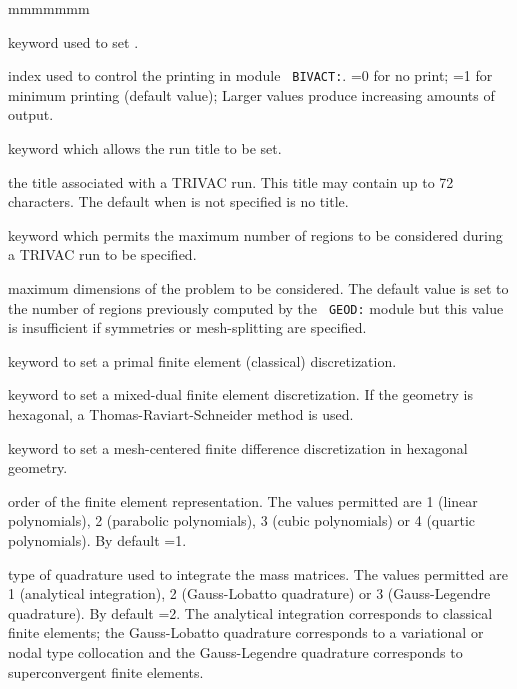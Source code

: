 \begin{ListeDeDescription}{mmmmmmm}

\item[\moc{EDIT}] keyword used to set .

\item[\dusa{iprint}] index used to control the printing  in module {\tt
BIVACT:}. =0 for no print; =1 for minimum printing (default value); Larger
values produce increasing amounts of output.

\item[\moc{TITL}] keyword which allows the run title to be set.

\item[\dusa{TITLE}] the title associated with a TRIVAC run. This
title may contain up to 72 characters. The default when  is not specified is no title.

\item[\moc{MAXR}] keyword which permits the maximum number of regions to be considered during a TRIVAC run to be specified.

\item[\dusa{maxpts}] maximum dimensions of the problem to be considered.  The
default value is set to the number of regions previously computed by the {\tt
GEOD:} module but this value is insufficient if symmetries or mesh-splitting
are specified.

\item[\moc{PRIM}] keyword to set a primal finite element (classical)
discretization.

\item[\moc{DUAL}] keyword to set a mixed-dual finite element discretization. If the
geometry is hexagonal, a Thomas-Raviart-Schneider method is used.\cite{rts}

\item[\moc{MCFD}] keyword to set a mesh-centered finite difference discretization
in hexagonal geometry.

\item[\dusa{ielem}] order of the finite element representation.  The values
permitted are 1 (linear polynomials), 2 (parabolic polynomials), 3 (cubic
polynomials) or 4 (quartic polynomials). By default =1.

\item[\dusa{icol}] type of quadrature used to integrate the mass matrices. The
values permitted are 1 (analytical integration), 2  (Gauss-Lobatto quadrature)
or 3 (Gauss-Legendre quadrature). By default =2. The analytical
integration corresponds to classical finite elements; the Gauss-Lobatto
quadrature corresponds to a variational or nodal type collocation and the
Gauss-Legendre quadrature corresponds to superconvergent finite elements.


\end{ListeDeDescription}
